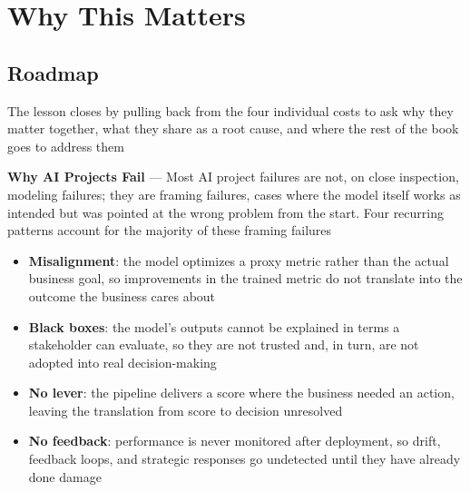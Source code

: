 \section{Why This Matters}
\label{chap:why-this-matters}

\subsection{Roadmap}
\label{sec:why-this-matters-roadmap}

The lesson closes by pulling back from the four individual costs to ask why they
matter together, what they share as a root cause, and where the rest of the book
goes to address them

\textbf{Why AI Projects Fail} --- Most AI project failures are not, on close
inspection, modeling failures; they are framing failures, cases where the model itself
works as intended but was pointed at the wrong problem from the start. Four
recurring patterns account for the majority of these framing failures

\begin{itemize}
  \item \textbf{Misalignment}: the model optimizes a proxy metric rather than the
    actual business goal, so improvements in the trained metric do not translate
    into the outcome the business cares about

  \item \textbf{Black boxes}: the model's outputs cannot be explained in terms a
    stakeholder can evaluate, so they are not trusted and, in turn, are not
    adopted into real decision-making

  \item \textbf{No lever}: the pipeline delivers a score where the business needed
    an action, leaving the translation from score to decision unresolved

  \item \textbf{No feedback}: performance is never monitored after deployment,
    so drift, feedback loops, and strategic responses go undetected until they
    have already done damage
\end{itemize}

